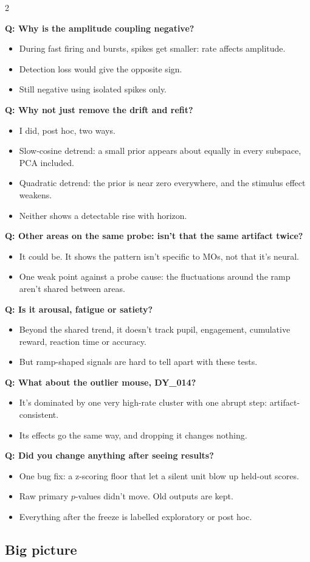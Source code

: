 \documentclass[10pt]{article}
\newcommand{\q}[2]{\par\smallskip\noindent\begin{minipage}{\linewidth}\raggedright{\bfseries\color{teal}Q: #1}\par\vspace{1pt}\begin{itemize}#2\end{itemize}\end{minipage}\par}
\begin{document}
\begin{multicols}{2}
\q{Why is the amplitude coupling negative?}{
\item During fast firing and bursts, spikes get smaller: rate affects amplitude.
\item Detection loss would give the opposite sign.
\item Still negative using isolated spikes only.}

\q{Why not just remove the drift and refit?}{
\item I did, post hoc, two ways.
\item Slow-cosine detrend: a small prior appears about equally in every subspace, PCA included.
\item Quadratic detrend: the prior is near zero everywhere, and the stimulus effect weakens.
\item Neither shows a detectable rise with horizon.}

\q{Other areas on the same probe: isn't that the same artifact twice?}{
\item It could be. It shows the pattern isn't specific to MOs, not that it's neural.
\item One weak point against a probe cause: the fluctuations around the ramp aren't shared between areas.}

\q{Is it arousal, fatigue or satiety?}{
\item Beyond the shared trend, it doesn't track pupil, engagement, cumulative reward, reaction time or accuracy.
\item But ramp-shaped signals are hard to tell apart with these tests.}

\q{What about the outlier mouse, DY\_014?}{
\item It's dominated by one very high-rate cluster with one abrupt step: artifact-consistent.
\item Its effects go the same way, and dropping it changes nothing.}

\q{Did you change anything after seeing results?}{
\item One bug fix: a z-scoring floor that let a silent unit blow up held-out scores.
\item Raw primary $p$-values didn't move. Old outputs are kept.
\item Everything after the freeze is labelled exploratory or post hoc.}

\subsection*{Big picture}


\end{multicols}
\end{document}
